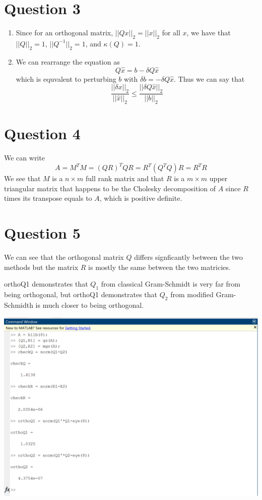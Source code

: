 \documentclass{article}
\newcommand{\inv}[1]{#1^{-1}}
\newcommand{\norm}[1]{||#1||}
\begin{document}
\section*{Question 3}
\begin{enumerate}
    \item Since for an orthogonal matrix, $\norm{Qx}_2 = \norm{x}_2$ for all $x$,
    we have that $\norm{Q}_2 = 1$, $\norm{\inv{Q}}_2 = 1$, and $\kappa(Q) = 1$.
    \item We can rearrange the equation as 
    \[
        Q\hat{x} = b - \delta Q\hat{x}
    \]
    which is equvalent to perturbing $b$ with 
    $\delta b = -\delta Q \hat{x}$.
    Thus we can say that 
    \[
        \frac{\norm{\delta x}_2}{\norm{\hat{x}}_2} \leq \frac{\norm{\delta Q \hat{x}}_2}{\norm{b}_2}
    \]
\end{enumerate}
\newpage 

\section*{Question 4}
We can write
\[
    A = M^TM = (QR)^TQR = R^T(Q^TQ)R = R^T R
\]
We see that $M$ is a $n \times m$ full rank matrix
and that $R$ is a $m \times m$ upper triangular matrix
that happens to be the Cholesky decomposition of $A$ since 
$R$ times its transpose equals to $A$, which is positive definite.
\newpage 

\section*{Question 5}
We can see that the orthogonal matrix $Q$ differs signficantly
between the two methods but the matrix $R$ is mostly the same
between the two matricies.

orthoQ1 demonstrates that $Q_1$ from classical Gram-Schmidt is very far from being orthogonal,
but orthoQ1 demonstrates that $Q_2$ from modified Gram-Schmidth is much closer to being orthogonal.

\includegraphics{question5.png}
\end{document}
